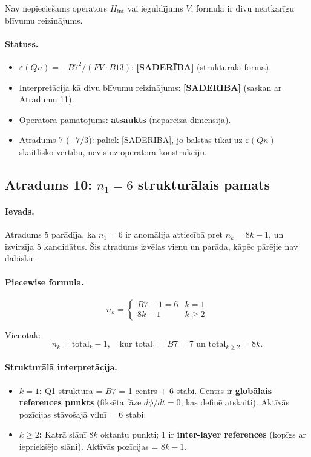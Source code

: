\documentclass[12pt,a4paper]{article}
\begin{document}
Nav nepieciešams operators $H_{\text{int}}$ vai ieguldījums $V$; formula ir divu neatkarīgu blīvumu reizinājums.

\paragraph{Statuss.}
\begin{itemize}
    \item $\varepsilon(Qn) = -B7^2/(FV \cdot B13)$: \textbf{[SADERĪBA]} (strukturāla forma).
    \item Interpretācija kā divu blīvumu reizinājums: \textbf{[SADERĪBA]} (saskan ar Atradumu 11).
    \item Operatora pamatojums: \textbf{atsaukts} (nepareiza dimensija).
    \item Atradums 7 ($-7/3$): paliek [SADERĪBA], jo balstās tikai uz $\varepsilon(Qn)$ skaitlisko vērtību, nevis uz operatora konstrukciju.
\end{itemize}

\subsection*{Atradums 10: $n_1 = 6$ strukturālais pamats}

\paragraph{Ievads.}
Atradums 5 parādīja, ka $n_1 = 6$ ir anomālija attiecībā pret $n_k = 8k-1$, un izvirzīja 5 kandidātus. Šis atradums izvēlas vienu un parāda, kāpēc pārējie nav dabiskie.

\paragraph{Piecewise formula.}
\[
n_k = \begin{cases} B7 - 1 = 6 & k=1 \\ 8k - 1 & k \geq 2 \end{cases}
\]

Vienotāk:
\[
n_k = \text{total}_k - 1, \quad \text{kur } \text{total}_1 = B7 = 7 \text{ un } \text{total}_{k\geq 2} = 8k.
\]

\paragraph{Strukturālā interpretācija.}
\begin{itemize}
    \item \textbf{$k=1$:} Q1 struktūra = $B7$ = 1 centrs + 6 stabi. Centrs ir \textbf{globālais references punkts} (fiksēta fāze $d\phi/dt = 0$, kas definē atskaiti). Aktīvās pozīcijas stāvošajā vilnī = 6 stabi.
    \item \textbf{$k\geq 2$:} Katrā slānī $8k$ oktantu punkti; 1 ir \textbf{inter-layer references} (kopīgs ar iepriekšējo slāni). Aktīvās pozīcijas = $8k-1$.
\end{itemize}
\end{document}
